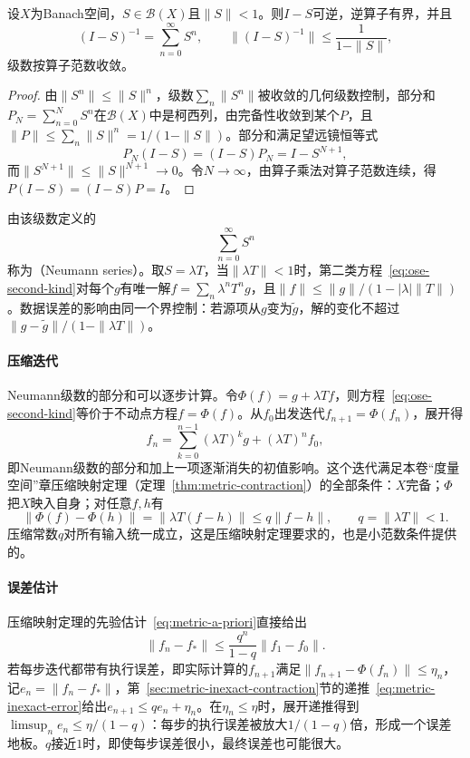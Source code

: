\begin{theorem}[Neumann级数]
\label{thm:ose-neumann}
设$X$为Banach空间，$S\in\mathcal B(X)$且$\|S\|<1$。则$I-S$可逆，逆算子有界，并且
\[
  (I-S)^{-1}=\sum_{n=0}^{\infty}S^n,\qquad\|(I-S)^{-1}\|\leq\frac{1}{1-\|S\|},
\]
级数按算子范数收敛。
\end{theorem}

\begin{proof}
由$\|S^n\|\leq\|S\|^n$，级数$\sum_n\|S^n\|$被收敛的几何级数控制，部分和$P_N=\sum_{n=0}^{N}S^n$在$\mathcal B(X)$中是柯西列，由完备性收敛到某个$P$，且$\|P\|\leq\sum_n\|S\|^n=1/(1-\|S\|)$。部分和满足望远镜恒等式
\[
  P_N(I-S)=(I-S)P_N=I-S^{N+1},
\]
而$\|S^{N+1}\|\leq\|S\|^{N+1}\to0$。令$N\to\infty$，由算子乘法对算子范数连续，得$P(I-S)=(I-S)P=I$。
\end{proof}

由该级数定义的
\[
  \sum_{n=0}^{\infty}S^n
\]
称为（Neumann series）。取$S=\lambda T$，当$\|\lambda T\|<1$时，第二类方程~\eqref{eq:ose-second-kind}对每个$g$有唯一解$f=\sum_n\lambda^nT^ng$，且$\|f\|\leq\|g\|/(1-|\lambda|\|T\|)$。数据误差的影响由同一个界控制：若源项从$g$变为$\tilde g$，解的变化不超过$\|g-\tilde g\|/(1-\|\lambda T\|)$。

\paragraph{压缩迭代}
Neumann级数的部分和可以逐步计算。令$\Phi(f)=g+\lambda Tf$，则方程~\eqref{eq:ose-second-kind}等价于不动点方程$f=\Phi(f)$。从$f_0$出发迭代$f_{n+1}=\Phi(f_n)$，展开得
\[
  f_n=\sum_{k=0}^{n-1}(\lambda T)^kg+(\lambda T)^nf_0 ,
\]
即Neumann级数的部分和加上一项逐渐消失的初值影响。这个迭代满足本卷“度量空间”章压缩映射定理（定理~\ref{thm:metric-contraction}）的全部条件：$X$完备；$\Phi$把$X$映入自身；对任意$f,h$有
\[
  \|\Phi(f)-\Phi(h)\|=\|\lambda T(f-h)\|\leq q\|f-h\|,\qquad q=\|\lambda T\|<1 .
\]
压缩常数$q$对所有输入统一成立，这是压缩映射定理要求的，也是小范数条件提供的。

\paragraph{误差估计}
压缩映射定理的先验估计~\eqref{eq:metric-a-priori}直接给出
\[
  \|f_n-f_*\|\leq\frac{q^n}{1-q}\|f_1-f_0\| .
\]
若每步迭代都带有执行误差，即实际计算的$f_{n+1}$满足$\|f_{n+1}-\Phi(f_n)\|\leq\eta_n$，记$e_n=\|f_n-f_*\|$，第~\ref{sec:metric-inexact-contraction}节的递推~\eqref{eq:metric-inexact-error}给出$e_{n+1}\leq qe_n+\eta_n$。在$\eta_n\leq\eta$时，展开递推得到$\limsup_ne_n\leq\eta/(1-q)$：每步的执行误差被放大$1/(1-q)$倍，形成一个误差地板。$q$接近$1$时，即使每步误差很小，最终误差也可能很大。

